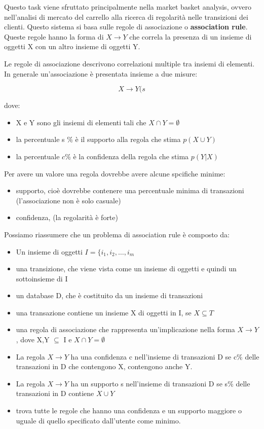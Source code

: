 \documentclass[a4paper]{extarticle}
\begin{document}
Questo task viene sfruttato principalmente nella market basket analysis, ovvero nell'analisi di mercato del carrello alla ricerca di regolarità nelle transizioni dei clienti. Questo sistema si basa sulle regole di associazione o \textbf{association rule}. Queste regole hanno la forma di $X \rightarrow Y$ che correla la presenza di un insieme di oggetti X con un altro insieme di oggetti Y.

Le regole di associazione descrivono correlazioni multiple tra insiemi di elementi. In generale un'associazione è presentata insieme a due misure:

\begin{equation*}
X \rightarrow Y (s%
\end{equation*}

dove:

\begin{itemize}
\item X e Y sono gli insiemi di elementi tali che $X \cap Y = \emptyset $
\item la percentuale s $\%$ è il supporto alla regola che stima $p (X \cup Y)$
\item la percentuale $c\%$ è la confidenza della regola che stima $p(Y|X)$
\end{itemize}

Per avere un valore una regola dovrebbe avere alcune spcifiche minime:
\begin{itemize}
\item supporto, cioè dovrebbe contenere una percentuale minima di transazioni (l'associazione non è solo casuale)
\item confidenza, (la regolarità è forte)
\end{itemize}

Possiamo riassumere che un problema di association rule è composto da:

\begin{itemize}
\item Un insieme di oggetti $I = \{i_1,i_2,\dots,i_m$
\item una transizione, che viene vista come un insieme di oggetti e quindi un sottoinsieme di I
\item un database D, che è costituito da un insieme di transazioni
\item una transazione contiene un insieme X di oggetti in I, se $X \subseteq T$
\item una regola di associazione che rappresenta un'implicazione nella forma $X 	\rightarrow Y$, dove X,Y $\subseteq$ I e $X \cap Y = \emptyset $
\item La regola $X \rightarrow Y$ ha una confidenza c nell'insieme di transazioni D se c$\%$ delle transazioni in D che contengono X, contengono anche Y.

\item La regola $X \rightarrow Y$ ha un supporto s nell'insieme di transazioni D se s$\%$ delle transazioni in D contiene $X\cup Y$

\item trova tutte le regole che hanno una confidenza e un supporto maggiore o uguale di quello specificato dall'utente come minimo.
\end{itemize}
\end{document}
